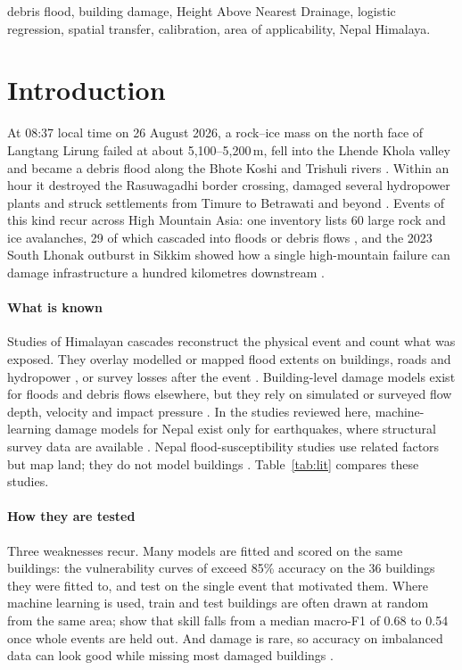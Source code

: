 \documentclass[journal,a4paper]{IEEEtran}
\begin{document}
\begin{IEEEkeywords}
debris flood, building damage, Height Above Nearest Drainage, logistic regression, spatial transfer, calibration, area of applicability, Nepal Himalaya.
\end{IEEEkeywords}

\section{Introduction}\label{sec:intro}

At 08:37 local time on 26 August 2026, a rock--ice mass on the north face of Langtang Lirung failed at about 5,100--5,200\,m, fell into the Lhende Khola valley and became a debris flood along the Bhote Koshi and Trishuli rivers \citep{icimod2026}. Within an hour it destroyed the Rasuwagadhi border crossing, damaged several hydropower plants and struck settlements from Timure to Betrawati and beyond \citep{icimod2026,li2026}. Events of this kind recur across High Mountain Asia: one inventory lists 60 large rock and ice avalanches, 29 of which cascaded into floods or debris flows \citep{zhong2024}, and the 2023 South Lhonak outburst in Sikkim showed how a single high-mountain failure can damage infrastructure a hundred kilometres downstream \citep{sattar2025}.

\paragraph{What is known} Studies of Himalayan cascades reconstruct the physical event and count what was exposed. They overlay modelled or mapped flood extents on buildings, roads and hydropower \citep{sattar2025,gouli2025,chen2025,li2026}, or survey losses after the event \citep{duwadi2024}. Building-level damage models exist for floods and debris flows elsewhere, but they rely on simulated or surveyed flow depth, velocity and impact pressure \citep{paulik2023,wuthrich2024,barnhart2024,wang2026}. In the studies reviewed here, machine-learning damage models for Nepal exist only for earthquakes, where structural survey data are available \citep{ghimire2022}. Nepal flood-susceptibility studies use related factors but map land; they do not model buildings \citep{duwal2023}. Table~\ref{tab:lit} compares these studies.

\paragraph{How they are tested} Three weaknesses recur. Many models are fitted and scored on the same buildings: the vulnerability curves of \citet{wang2026} exceed 85\% accuracy on the 36 buildings they were fitted to, and \citet{barnhart2024} test on the single event that motivated them. Where machine learning is used, train and test buildings are often drawn at random from the same area; \citet{currie2026} show that skill falls from a median macro-F1 of 0.68 to 0.54 once whole events are held out. And damage is rare, so accuracy on imbalanced data can look good while missing most damaged buildings \citep{elreedy2023,vandengoorbergh2022}.
\end{document}
